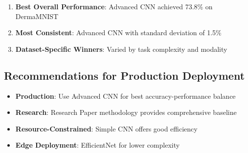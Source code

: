 \documentclass[12pt,a4paper]{article}
\begin{document}
\begin{enumerate}
    \item \textbf{Best Overall Performance}: Advanced CNN achieved 73.8\% on DermaMNIST
    \item \textbf{Most Consistent}: Advanced CNN with standard deviation of 1.5\%
    \item \textbf{Dataset-Specific Winners}: Varied by task complexity and modality
\end{enumerate}

\subsection{Recommendations for Production Deployment}

\begin{itemize}
    \item \textbf{Production}: Use Advanced CNN for best accuracy-performance balance
    \item \textbf{Research}: Research Paper methodology provides comprehensive baseline
    \item \textbf{Resource-Constrained}: Simple CNN offers good efficiency
    \item \textbf{Edge Deployment}: EfficientNet for lower complexity
\end{itemize}
\end{document}
